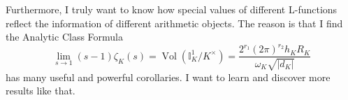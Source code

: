 \documentclass[12pt]{article}
\newcommand{\bb}[1]{\mathbb{#1}}
\theoremstyle{definition}
\begin{document}
Furthermore, I truly want to know how special values of different 
L-functions reflect the information of different arithmetic objects. 
The reason is that 
I find the Analytic Class Formula
$$
\lim_{s\rightarrow 1}(s-1)\zeta_K(s)=\operatorname{Vol}\left(\bb{I}_K^1/K^\times\right)=\frac{2^{r_1}(2\pi)^{r_2}h_K R_K}{\omega_K \sqrt{|d_K|}}
$$
has many useful and powerful corollaries. I want to learn and discover more results like that.



\end{document}
